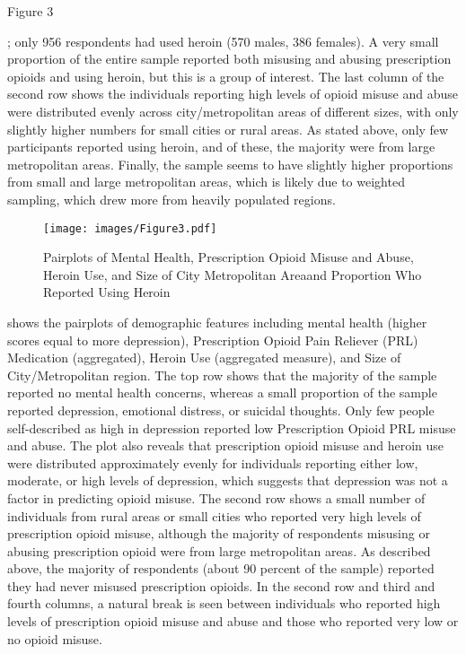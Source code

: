 \documentclass[sigconf]{acmart}
\begin{document}

Figure 3 

; only 956 respondents had used heroin (570 males, 
386 females). 
 A very 
small proportion of the entire sample reported both misusing and abusing 
prescription opioids and using heroin, but this is a group of interest. The 
last column of the second row shows the individuals reporting high levels of 
opioid misuse and abuse were distributed evenly across city/metropolitan areas 
of different sizes, with only slightly higher numbers for small cities or 
rural areas. As stated above, only few participants reported using heroin, and 
of these, the majority were from large metropolitan areas. Finally, the sample 
seems to have slightly higher proportions from small and large metropolitan 
areas, which is likely due to weighted sampling, which drew more from heavily 
populated regions.

\begin{figure}[!ht]
  \centering\texttt{[image: images/Figure3.pdf]}
  \caption{Pairplots of Mental Health, Prescription Opioid Misuse and Abuse,
  Heroin Use, and Size of City Metropolitan Areaand Proportion Who Reported Using Heroin}
  \label{f:Figure3}
\end{figure}


shows the pairplots of demographic features including mental health
(higher scores equal to more depression), Prescription Opioid Pain Reliever
(PRL) Medication (aggregated), Heroin Use (aggregated measure), and Size of 
City/Metropolitan region. The top row shows that the majority of the sample 
reported no mental health concerns, whereas a small proportion of the sample 
reported depression, emotional distress, or suicidal thoughts. Only few people 
self-described as high in depression reported low Prescription Opioid PRL 
misuse and abuse. The plot also reveals that prescription opioid misuse and 
heroin use were distributed approximately evenly for individuals reporting 
either low, moderate, or high levels of depression, which suggests that 
depression was not a factor in predicting opioid misuse. The second row shows 
a small number of individuals from rural areas or small cities who reported 
very high levels of prescription opioid misuse, although the majority of 
respondents misusing or abusing prescription opioid were from large 
metropolitan areas. As described above, the majority of respondents (about
90 percent of the sample) reported they had never misused prescription 
opioids. In the second row and third and fourth columns, a natural break is 
seen between individuals who reported high levels of prescription opioid 
misuse and abuse and those who reported very low or no opioid misuse.
\end{document}
